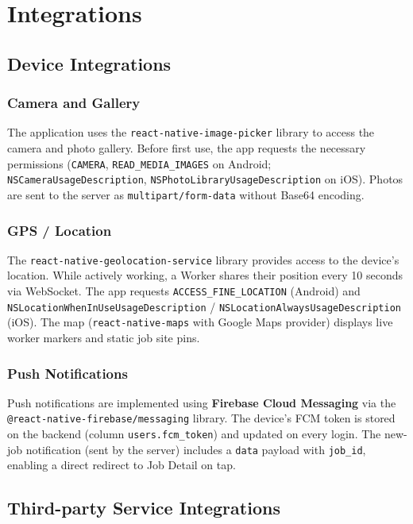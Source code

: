 \chapter{Integrations}

\section{Device Integrations}

\subsection{Camera and Gallery}
The application uses the \texttt{react-native-image-picker} library to access the camera and photo gallery. Before first use, the app requests the necessary permissions (\texttt{CAMERA}, \texttt{READ\_MEDIA\_IMAGES} on Android; \texttt{NSCameraUsageDescription}, \texttt{NSPhotoLibraryUsageDescription} on iOS). Photos are sent to the server as \texttt{multipart/form-data} without Base64 encoding.

\subsection{GPS / Location}
The \texttt{react-native-geolocation-service} library provides access to the device's location. While actively working, a Worker shares their position every 10 seconds via WebSocket. The app requests \texttt{ACCESS\_FINE\_LOCATION} (Android) and \texttt{NSLocationWhenInUseUsageDescription} / \texttt{NSLocationAlwaysUsageDescription} (iOS). The map (\texttt{react-native-maps} with Google Maps provider) displays live worker markers and static job site pins.

\subsection{Push Notifications}
Push notifications are implemented using \textbf{Firebase Cloud Messaging} via the \texttt{@react-native-firebase/messaging} library. The device's FCM token is stored on the backend (column \texttt{users.fcm\_token}) and updated on every login. The new-job notification (sent by the server) includes a \texttt{data} payload with \texttt{job\_id}, enabling a direct redirect to Job Detail on tap.

\section{Third-party Service Integrations}

